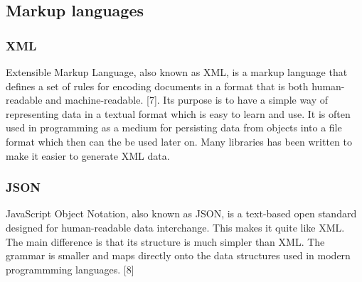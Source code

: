 \subsection{Markup languages}

\subsubsection{XML}
Extensible Markup Language, also known as XML, is a markup language that defines a set of rules for encoding documents in a format that is both human-readable and machine-readable.  [7]. Its purpose is to have a simple way of representing data in a textual format which is easy to learn and use. It is often used in programming as a medium for persisting data from objects into a file format which then can the be used later on. Many libraries has been written to make it easier to generate XML data.

\subsubsection{JSON}
JavaScript Object Notation, also known as JSON, is a text-based open standard designed for human-readable data interchange. This makes it quite like XML. The main difference is that its structure is much simpler than XML. The grammar is smaller and maps directly onto the data structures used in modern programmming languages. [8]

